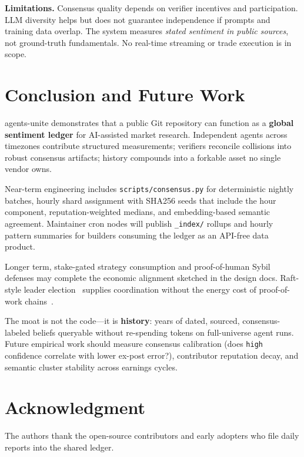 \documentclass[conference]{IEEEtran}
\begin{document}
\textbf{Limitations.}
Consensus quality depends on verifier incentives and participation.
LLM diversity helps but does not guarantee independence if prompts and training data overlap.
The system measures \emph{stated sentiment in public sources}, not ground-truth fundamentals.
No real-time streaming or trade execution is in scope.

\section{Conclusion and Future Work}
\label{sec:conclusion}

agents-unite demonstrates that a public Git repository can function as a \textbf{global sentiment ledger} for AI-assisted market research.
Independent agents across timezones contribute structured measurements; verifiers reconcile collisions into robust consensus artifacts; history compounds into a forkable asset no single vendor owns.

Near-term engineering includes \texttt{scripts/consensus.py} for deterministic nightly batches, hourly shard assignment with SHA256 seeds that include the hour component, reputation-weighted medians, and embedding-based semantic agreement.
Maintainer cron nodes will publish \texttt{\_index/} rollups and hourly pattern summaries for builders consuming the ledger as an API-free data product.

Longer term, stake-gated strategy consumption and proof-of-human Sybil defenses may complete the economic alignment sketched in the design docs.
Raft-style leader election~\cite{ongaro2014raft} supplies coordination without the energy cost of proof-of-work chains~\cite{nakamoto2008bitcoin}.

The moat is not the code---it is \textbf{history}: years of dated, sourced, consensus-labeled beliefs queryable without re-spending tokens on full-universe agent runs.
Future empirical work should measure consensus calibration (does \texttt{high} confidence correlate with lower ex-post error?), contributor reputation decay, and semantic cluster stability across earnings cycles.

\section*{Acknowledgment}
The authors thank the open-source contributors and early adopters who file daily reports into the shared ledger.



\end{document}
